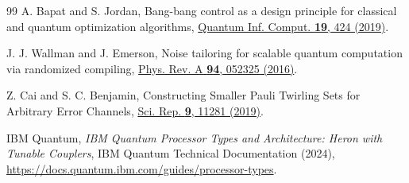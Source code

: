 \documentclass[aps,pra,reprint,superscriptaddress,floatfix,nofootinbib]{revtex4-2}
\begin{document}
\begin{thebibliography}{99}
A. Bapat and S. Jordan, Bang-bang control as a design principle for classical and quantum optimization algorithms, \href{https://doi.org/10.26421/QIC19.5-6-4}{Quantum Inf. Comput. \textbf{19}, 424 (2019)}.

J. J. Wallman and J. Emerson, Noise tailoring for scalable quantum computation via randomized compiling, \href{https://doi.org/10.1103/PhysRevA.94.052325}{Phys. Rev. A \textbf{94}, 052325 (2016)}.

Z. Cai and S. C. Benjamin, Constructing Smaller Pauli Twirling Sets for Arbitrary Error Channels, \href{https://doi.org/10.1038/s41598-019-46722-7}{Sci. Rep. \textbf{9}, 11281 (2019)}.

IBM Quantum, \textit{IBM Quantum Processor Types and Architecture: Heron with Tunable Couplers}, IBM Quantum Technical Documentation (2024), \href{https://docs.quantum.ibm.com/guides/processor-types}{https://docs.quantum.ibm.com/guides/processor-types}.

\end{thebibliography}
\end{document}
